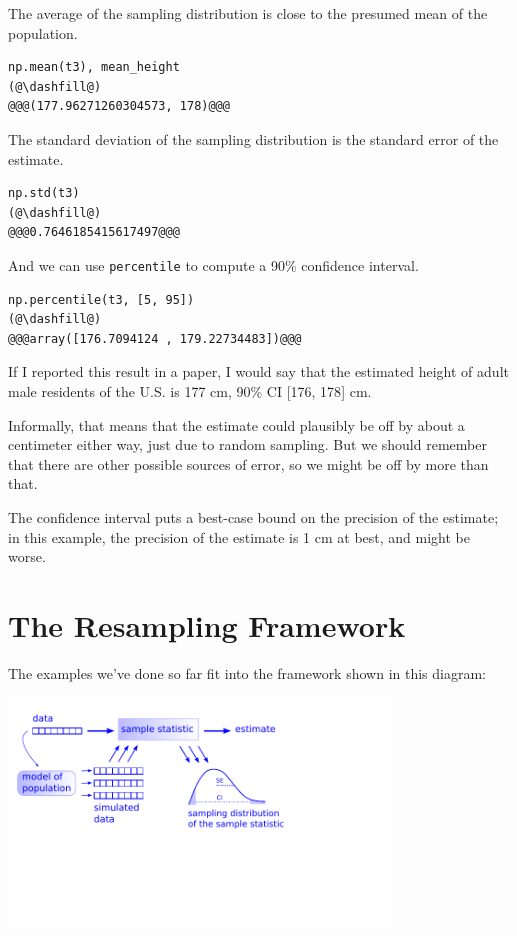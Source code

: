 The average of the sampling distribution is close to the presumed mean
of the population.

\begin{lstlisting}[]
np.mean(t3), mean_height
(@\dashfill@)
@@@(177.96271260304573, 178)@@@
\end{lstlisting}

The standard deviation of the sampling distribution is the standard
error of the estimate.

\begin{lstlisting}[]
np.std(t3)
(@\dashfill@)
@@@0.7646185415617497@@@
\end{lstlisting}

And we can use \passthrough{\lstinline!percentile!} to compute a 90\%
confidence interval.

\begin{lstlisting}[]
np.percentile(t3, [5, 95])
(@\dashfill@)
@@@array([176.7094124 , 179.22734483])@@@
\end{lstlisting}

If I reported this result in a paper, I would say that the estimated
height of adult male residents of the U.S. is 177 cm, 90\% CI {[}176,
178{]} cm.

Informally, that means that the estimate could plausibly be off by about
a centimeter either way, just due to random sampling. But we should
remember that there are other possible sources of error, so we might be
off by more than that.

The confidence interval puts a best-case bound on the precision of the
estimate; in this example, the precision of the estimate is 1 cm at
best, and might be worse.

\hypertarget{the-resampling-framework}{%
\section{The Resampling Framework}\label{the-resampling-framework}}

The examples we've done so far fit into the framework shown in this
diagram:

\includegraphics[width=4in]{chapters/figs/resampling.pdf}

